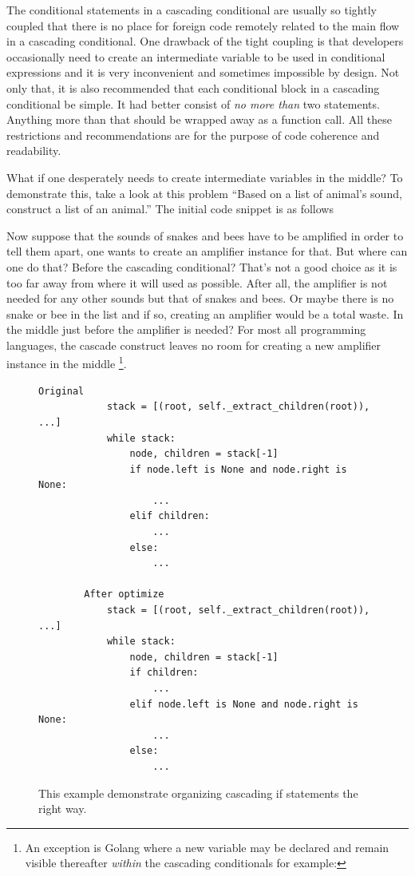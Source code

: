 The conditional statements in a cascading conditional are usually so tightly coupled that
there is no place for foreign code remotely related to the main flow in a cascading conditional.
One drawback of the tight coupling is that developers occasionally need to create an intermediate
variable to be used in conditional expressions and
it is very inconvenient and sometimes impossible by design.
Not only that, it is also recommended that each conditional block in a cascading conditional be
simple.
It had better consist of \emph{no more than} two statements.
Anything more than that should be wrapped away as a function call.
All these restrictions and recommendations are for the purpose of code coherence and readability.

What if one desperately needs to create intermediate variables in the middle?
To demonstrate this, take a look at this problem ``Based on a list of animal's sound,
construct a list of an animal.''
The initial code snippet is as follows

Now suppose that the sounds of snakes and bees have to be amplified in order to tell them apart,
one wants to create an amplifier instance for that.
But where can one do that?
Before the cascading conditional?
That's not a good choice as it is too far away from where it will used as possible.
After all, the amplifier is not needed for any other sounds but that of snakes and bees.
Or maybe there is no snake or bee in the list and if so, creating an amplifier would be a total
waste.
In the middle just before the amplifier is needed?
For most all programming languages, the
cascade construct leaves no room for creating a new amplifier instance in the middle
\footnote{An exception is Golang where a new variable may be declared and remain visible
thereafter \emph{within} the cascading conditionals for example:

}.

\begin{figure}[H]
  \centering
    \begin{lstlisting}[basicstyle=\ttfamily\small]
        Original
            stack = [(root, self._extract_children(root)), ...]
            while stack:
                node, children = stack[-1]
                if node.left is None and node.right is None:
                    ...
                elif children:
                    ...
                else:
                    ...

        After optimize
            stack = [(root, self._extract_children(root)), ...]
            while stack:
                node, children = stack[-1]
                if children:
                    ...
                elif node.left is None and node.right is None:
                    ...
                else:
                    ...
    \end{lstlisting}
  \caption{This example demonstrate organizing cascading if statements the right way.}
\end{figure}

